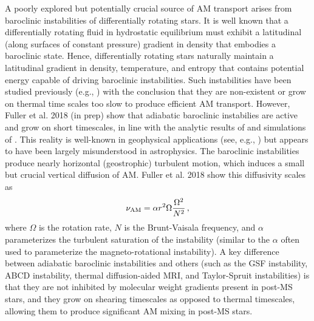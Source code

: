 A poorly explored but potentially crucial source of AM transport arises from baroclinic instabilities of differentially rotating stars. It is well known that a differentially rotating fluid in hydrostatic equilibrium must exhibit a latitudinal (along surfaces of constant pressure) gradient in density that embodies a baroclinic state. Hence, differentially rotating stars naturally maintain a latitudinal gradient in density, temperature, and entropy that contains potential energy capable of driving baroclinic instabilities. Such instabilities have been studied previously (e.g., \citealt{goldreich:67,knobloch:82,knobloch:83,spruit:83,spruit:84,zahn:93}) with the conclusion that they are non-existent or grow on thermal time scales too slow to produce efficient AM transport. However, Fuller et al. 2018 (in prep) show that adiabatic baroclinic instabilies are active and grow on short timescales, in line with the analytic results of \citep{tassoul:82,fujimoto:87,fujimoto:88} and simulations of \cite{simitev:17}. This reality is well-known in geophysical applications (see, e.g., \citealt{pedlosky:92}) but appears to have been largely misunderstood in astrophysics. The baroclinic instabilities produce nearly horizontal (geostrophic) turbulent motion, which induces a small but crucial vertical diffusion of AM. Fuller et al. 2018 show this diffusivity scales as
\begin{equation}
\label{numri} 
\nu_{\rm AM} = \alpha r^2 \Omega \frac{\Omega^2}{N^2} \, ,
\end{equation}
where $\Omega$ is the rotation rate, $N$ is the Brunt-Vaisala frequency, and $\alpha$ parameterizes the turbulent saturation of the instability (similar to the $\alpha$ often used to parameterize the magneto-rotational instability). A key difference between adiabatic baroclinic instabilities and others (such as the GSF instability, ABCD instability, thermal diffusion-aided MRI, and Taylor-Spruit instabilities) is that they are not inhibited by molecular weight gradients present in post-MS stars, and they grow on shearing timescales as opposed to thermal timescales, allowing them to produce significant AM mixing in post-MS stars.




